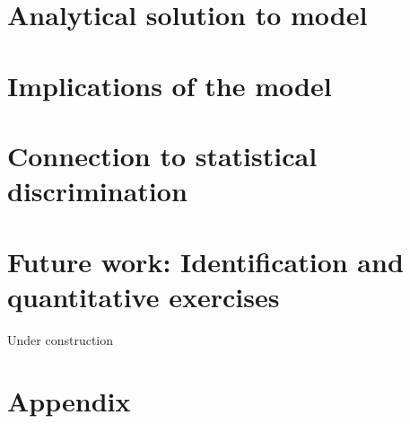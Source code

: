 \documentclass[11 pt]{article}
\begin{document}


\section{Analytical solution to model}\label{sec:analytic_results}




\section{Implications of the model}\label{sec:sims}



\section{Connection to statistical discrimination}\label{sec:stat_discrim}



\section{Future work: Identification and quantitative exercises}\label{sec:future_work}

% 
Under construction

\printbibliography

\section*{Appendix}
\setcounter{section}{0}
\setcounter{subsection}{0}
\renewcommand{\thesubsection}{A.\arabic{subsection}}



% 
\end{document}
